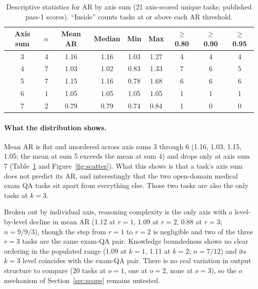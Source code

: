 \documentclass[11pt]{article}
\begin{document}
\begin{table}[ht]
\centering
\small
\caption{Descriptive statistics for AR by axis sum (21 axis-scored unique tasks; published pass-1 scores). ``Inside'' counts tasks at or above each AR threshold.}
\label{tab:descriptives}
\begin{tabular}{@{}crccccccc@{}}
\toprule
Axis sum & $n$ & Mean AR & Median & Min & Max & $\geq$0.80 & $\geq$0.90 & $\geq$0.95 \\
\midrule
3 & 4 & 1.16 & 1.16 & 1.03 & 1.27 & 4 & 4 & 4 \\
4 & 7 & 1.03 & 1.02 & 0.83 & 1.33 & 7 & 6 & 5 \\
5 & 7 & 1.15 & 1.16 & 0.78 & 1.68 & 6 & 6 & 6 \\
6 & 1 & 1.05 & 1.05 & 1.05 & 1.05 & 1 & 1 & 1 \\
7 & 2 & 0.79 & 0.79 & 0.74 & 0.84 & 1 & 0 & 0 \\
\bottomrule
\end{tabular}
\end{table}

\paragraph{What the distribution shows.}
Mean AR is flat and unordered across axis sums 3 through 6 (1.16, 1.03, 1.15, 1.05; the mean at sum 5 exceeds the mean at sum 4) and drops only at axis sum 7 (Table~\ref{tab:descriptives} and Figure~\ref{fig:scatter}). What this shows is that a task's axis sum does not predict its AR, and interestingly that the two open-domain medical exam QA tasks sit apart from everything else. Those two tasks are also the only tasks at $k=3$.

Broken out by individual axis, reasoning complexity is the only axis with a level-by-level decline in mean AR (1.12 at $r=1$, 1.09 at $r=2$, 0.88 at $r=3$; $n = 9/9/3$), though the step from $r=1$ to $r=2$ is negligible and two of the three $r=3$ tasks are the same exam-QA pair. Knowledge boundedness shows no clear ordering in the populated range (1.09 at $k=1$, 1.11 at $k=2$; $n = 7/12$) and its $k=3$ level coincides with the exam-QA pair. There is no real variation in output structure to compare (20 tasks at $o=1$, one at $o=2$, none at $o=3$), so the $o$ mechanism of Section~\ref{sec:scope} remains untested.
\end{document}
